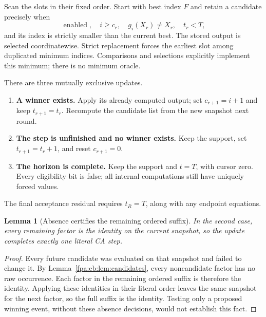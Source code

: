 \documentclass[11pt,a4paper]{article}
\numberwithin{equation}{section}
\newtheorem{lemma}[theorem]{Lemma}
\begin{document}
Scan the slots in their fixed order. Start with best index $F$ and retain a candidate precisely when
\[
\operatorname{enabled},\quad i\geq c_r,\quad g_i(X_r)\neq X_r,
\quad t_r<T,
\]
and its index is strictly smaller than the current best. The stored output is selected coordinatewise. Strict replacement forces the earliest slot among duplicated minimum indices. Comparisons and selections explicitly implement this minimum; there is no minimum oracle.

There are three mutually exclusive updates.
\begin{enumerate}
\item \textbf{A winner exists.} Apply its already computed output; set $c_{r+1}=i+1$ and keep $t_{r+1}=t_r$. Recompute the candidate list from the new snapshot next round.
\item \textbf{The step is unfinished and no winner exists.} Keep the support, set $t_{r+1}=t_r+1$, and reset $c_{r+1}=0$.
\item \textbf{The horizon is complete.} Keep the support and $t=T$, with cursor zero. Every eligibility bit is false; all internal computations still have uniquely forced values.
\end{enumerate}
The final acceptance residual requires $t_R=T$, along with any endpoint equations.

\begin{lemma}[Absence certifies the remaining ordered suffix]\label{fpa:eb:lem:absence}
In the second case, every remaining factor is the identity on the current snapshot, so the update completes exactly one literal CA step.
\end{lemma}
\begin{proof}
Every future candidate was evaluated on that snapshot and failed to change it. By Lemma~\ref{fpa:eb:lem:candidates}, every noncandidate factor has no raw occurrence. Each factor in the remaining ordered suffix is therefore the identity. Applying these identities in their literal order leaves the same snapshot for the next factor, so the full suffix is the identity. Testing only a proposed winning event, without these absence decisions, would not establish this fact.
\end{proof}
\end{document}
